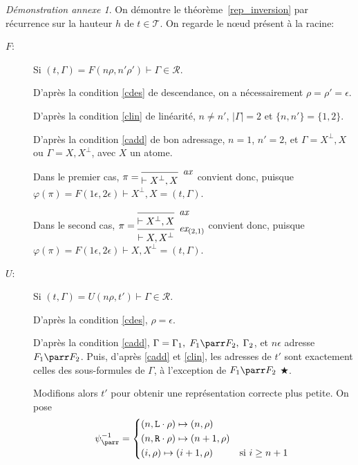 \documentclass[11pt,a4paper]{article}
\theoremstyle{plain}
\theoremstyle{definition}
\theoremstyle{remark}
\newtheorem{demonstrationappendix}{Démonstration annexe}
\newcommand*{\orth}{^\perp}
\newcommand*{\axv}[1]{\infer{0}[\ensuremath{\mathit{ax}}]{\vdash #1}}
\newcommand*{\permv}[2]{\infer{1}[\ensuremath{\textit{ex}_{#1}}]{\vdash #2}}
\newcommand*{\someadd}{\rho}
\newcommand*{\someproof}{\pi}
\newcommand*{\sequent}{\Gamma}
\newcommand*{\size}[1]{\mathopen{|}#1\mathclose{|}}
\newcommand*{\Left}{\textnormal{\texttt{L}}}
\newcommand*{\Right}{\textnormal{\texttt{R}}}
\newcommand*{\trees}{\ensuremath{\mathcal{T}}}
\newcommand*{\representations}{\ensuremath{\mathcal{R}}}
\newcommand*{\encode}{\ensuremath{\varphi}}
\newcommand*{\height}{\ensuremath{h}}
\begin{document}
\begin{demonstrationappendix}
    \label{proof_rep_inversion}
    On démontre le théorème~\ref{rep_inversion} par récurrence sur la hauteur $\height$ de $t \in \trees$. On regarde le n\oe ud présent à la racine:
    \begin{description}
        \item[$F$:]    
        Si $(t, \sequent) = F(n\rho, n'\rho') \vdash \sequent \in \representations$.
    
        D'après la condition \ref{cdes} de descendance, on a nécessairement $\rho = \rho' = \epsilon$.
    
        D'après la condition \ref{clin} de linéarité, $n \neq n'$, $\size{\sequent} = 2$ et $\{n, n'\} = \{1, 2\}$.
    
        D'après la condition \ref{cadd} de bon adressage, $n = 1$, $n' = 2$, et $\sequent = X\orth, X$ ou $\sequent = X, X\orth$, avec $X$ un atome.
    
        Dans le premier cas,
        $\someproof = \begin{prooftree}
                \axv{X\orth, X}
            \end{prooftree}$ convient donc, puisque $\encode \left( \someproof \right) = F(1 \epsilon, 2 \epsilon) \vdash X\orth, X = (t, \sequent)$.
    
        Dans le second cas,
        $\someproof = \begin{prooftree}
                \axv{X\orth, X}
                \permv{(2, 1)}{X, X\orth}
            \end{prooftree}$ convient donc, puisque $\encode \left( \someproof \right) = F(1 \epsilon, 2 \epsilon) \vdash X, X\orth = (t, \sequent)$.
         
        \item[$U$:] Si $(t, \sequent) = U(n\rho, t') \vdash \sequent \in \representations$.
    
        D'après la condition \ref{cdes}, $\rho = \epsilon$.
    
        D'après la condition \ref{cadd}, $\sequent = \sequent_1, \; F_1 \parr F_2, \; \sequent_2$, et $n\epsilon$ adresse $F_1 \parr F_2$. Puis, d'après \ref{cadd} et \ref{clin}, les adresses de $t'$ sont exactement celles des sous-formules de $\sequent$, à l'exception de $F_1 \parr F_2$ $\bigstar$.
    
        Modifions alors $t'$ pour obtenir une représentation correcte plus petite. On pose 
        \begin{equation*}
            \psi_\parr^{-1} =
            \begin{cases*}
                (n, \Left \cdot \someadd) \mapsto (n, \someadd)\\
                (n, \Right \cdot \someadd) \mapsto (n+1, \someadd)\\
                (i, \someadd) \mapsto (i+1, \someadd) & si $i \geq n+1$
            \end{cases*}
        \end{equation*}
        

\end{description}
\end{demonstrationappendix}
\end{document}
